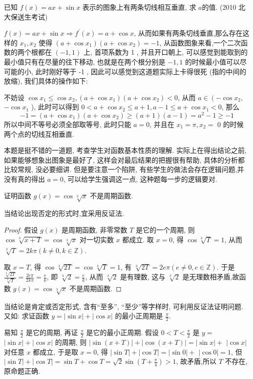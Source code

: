 \begin{example}
	已知 $f(x)=a x+\sin x$ 表示的图象上有两条切线相互垂直, 求 $a$的值. (2010 北大保送生考试)
\end{example}
\begin{solution}
	$f(x)=a x+\sin x \Rightarrow f^{\prime}(x)=a+\cos x$, 从而如果有两条切线垂直,那么存在这样的 $x_{1}, x_{2}$ 使得 $\left(a+\cos x_{1}\right)\left(a+\cos x_{2}\right)=-1$, 从函数图象来看,一个二次函数的两个根都在 $(-1,1)$ 上, 首项系数为 1 , 并且开口朝上, 可以感觉到能取到的最小值只有在尽量的往下移动, 也就是在两个根分别是 $-1,1$ 的时候最小值可以尽可能的小, 此时刚好等于 -1 , 因此可以感觉到这道题实际上卡得很死 (指的中间的放缩), 我们具体的操作如下:

	不妨设 $\cos x_{1} \leqslant \cos x_{2},\left(a+\cos x_{1}\right)\left(a+\cos x_{2}\right)<0$, 从而 $a \in\left(-\cos x_{2}\right.$, $-\cos x_{1}$ ), 此时可以得到 $0<a+\cos x_{2} \leqslant a+1, a-1 \leqslant a+\cos x_{1}<0$, 那么
	$$
		-1=\left(a+\cos x_{1}\right)\left(a+\cos x_{2}\right) \geqslant(a+1)(a-1)=a^{2}-1 \geqslant-1
	$$
	所以中间不等号必须全部取等号, 此时只能 $a=0$, 并且在 $x_{1}=\pi, x_{2}=$ 0 的时候两个点的切线互相垂直.
\end{solution}
\begin{note}
	本题是挺不错的一道题, 考查学生对函数基本性质的理解. 实际上在得出结论之前, 如果能够想象出图象是最好了, 这样会对最后结果的把握很有帮助, 具体的分析都比较常规, 没必要细讲. 但是要注意一个陷阱, 有些学生的做法会存在逻辑问题,并没有真的得出 $a=0$, 可以给学生强调这一点, 这种题每一步的逻辑要对.
\end{note}

\begin{example}
	证明函数 $g(x)=\cos \sqrt[3]{x}$ 不是周期函数.
\end{example}
\begin{analysis}
	当结论出现否定的形式时,宜采用反证法.
\end{analysis}
\begin{proof}
	假设 $g(x)$ 是周期函数, 非零常数 $T$ 是它的一个周期, 则 $\cos \sqrt[3]{x+T}=\cos \sqrt[3]{x}$ 对一切实数 $x$ 都成立. 取 $x=0$, 得 $\cos \sqrt[3]{T}=1$, 从而 $\sqrt[3]{T}=2 k \pi(k \neq 0, k \in \mathbb{Z})$.

	取 $x=T$, 得 $\cos \sqrt[3]{2 T}=\cos \sqrt[3]{T}=1$, 有 $\sqrt[3]{2 T}=2 e \pi(e \neq 0, e \in \mathbb{Z})$. 于是 $\frac{\sqrt[3]{2 T}}{\sqrt[3]{T}}=\frac{2 e \pi}{2 k \pi}=\frac{e}{k}$, 即 $\sqrt[3]{2}=\frac{e}{k}$, 从而 $\sqrt[3]{2}$ 是有理数, 这与 $\sqrt[3]{2}$ 是无理数相矛盾,故函数 $g(x)=\cos \sqrt[3]{x}$ 不是周期函数.
\end{proof}
\begin{note}
	当结论是肯定或否定形式, 含有“至多”, “至少”等字样时, 可利用反证法证明问题. 又如: 求证函数 $y=|\sin x|+|\cos x|$ 的最小正周期是 $\frac{\pi}{2}$.

	易知 $\frac{\pi}{2}$ 是它的周期, 再证 $\frac{\pi}{2}$ 是它的最小正周期. 假设 $0<T<\frac{\pi}{2}$ 是 $y=$ $|\sin x|+|\cos x|$ 的周期, 则 $|\sin (x+T)|+|\cos (x+T)|=|\sin x|+$ $|\cos x|$ 对任意 $x$ 都成立, 于是取 $x=0$, 得 $|\sin T|+|\cos T|=|\sin 0|+$ $|\cos 0|=1$, 但 $|\sin T|+|\cos T|=\sin T+\cos T=\sqrt{2} \sin \left(T+\frac{\pi}{4}\right)>1$, 故矛盾,所以 $T$ 不存在,原命题正确.
\end{note}

